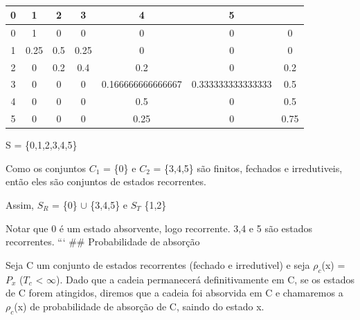 \documentclass[]{article}
\theoremstyle{definition}
\theoremstyle{definition}
\theoremstyle{definition}
\theoremstyle{remark}
\begin{document}
\begin{table}[h]
\centering
\caption{}
\begin{tabular}{|c|c|c|c|c|c|c|}
\hline
0 & \cellcolor[HTML]{FE0000}1 & 2   & 3    & 4                                         & 5                                         &                              \\ \hline
0 & 1                         & 0   & 0    & 0                                         & 0                                         & 0                            \\ \hline
1 & 0.25                      & 0.5 & 0.25 & 0                                         & 0                                         & 0                            \\ \hline
2 & 0                         & 0.2 & 0.4  & 0.2                                       & 0                                         & 0.2                          \\ \hline
3 & 0                         & 0   & 0    & \cellcolor[HTML]{FE0000}0.166666666666667 & \cellcolor[HTML]{FE0000}0.333333333333333 & \cellcolor[HTML]{FE0000}0.5  \\ \hline
4 & 0                         & 0   & 0    & \cellcolor[HTML]{FE0000}0.5               & \cellcolor[HTML]{FE0000}0                 & \cellcolor[HTML]{FE0000}0.5  \\ \hline
5 & 0                         & 0   & 0    & \cellcolor[HTML]{FE0000}0.25              & \cellcolor[HTML]{FE0000}0                 & \cellcolor[HTML]{FE0000}0.75 \\ \hline
\end{tabular}
\end{table}

S = \{0,1,2,3,4,5\}

Como os conjuntos \(C_1\) = \{0\} e \(C_2\) = \{3,4,5\} são finitos,
fechados e irredutiveis, então eles são conjuntos de estados
recorrentes.

Assim, \(S_R\) = \{0\} \(\cup\) \{3,4,5\} e \(S_T\) \{1,2\}

Notar que 0 é um estado absorvente, logo recorrente. 3,4 e 5 são estados
recorrentes. ``` \#\# Probabilidade de absorção

Seja C um conjunto de estados recorrentes (fechado e irredutivel) e seja
\(\rho_c\)(x) = \(P_x\) (\(T_c\) \textless{} \(\infty\)). Dado que a
cadeia permanecerá definitivamente em C, se os estados de C forem
atingidos, diremos que a cadeia foi absorvida em C e chamaremos a
\(\rho_c\)(x) de probabilidade de absorção de C, saindo do estado x.
\end{document}
